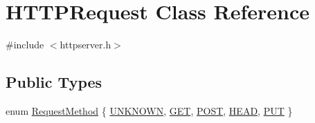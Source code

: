 \hypertarget{class_h_t_t_p_request}{}\section{H\+T\+T\+P\+Request Class Reference}
\label{class_h_t_t_p_request}


{\ttfamily \#include $<$httpserver.\+h$>$}

\subsection*{Public Types}
\begin{DoxyCompactItemize}
\item 
enum \mbox{\hyperlink{class_h_t_t_p_request_a1afe92e9caad997b8f88f0cb07dcc5aa}{Request\+Method}} \{ \newline
\mbox{\hyperlink{class_h_t_t_p_request_a1afe92e9caad997b8f88f0cb07dcc5aaae2331c29519b3237f4926d5be5f7c7a4}{U\+N\+K\+N\+O\+WN}}, 
\mbox{\hyperlink{class_h_t_t_p_request_a1afe92e9caad997b8f88f0cb07dcc5aaa066288ebc3abf9337c20f7d69a7cb77f}{G\+ET}}, 
\mbox{\hyperlink{class_h_t_t_p_request_a1afe92e9caad997b8f88f0cb07dcc5aaac8de8b5303c92a9f833e9e68c18d02d9}{P\+O\+ST}}, 
\mbox{\hyperlink{class_h_t_t_p_request_a1afe92e9caad997b8f88f0cb07dcc5aaaed9ed095188e3bc8f7235e41972afbe9}{H\+E\+AD}}, 
\newline
\mbox{\hyperlink{class_h_t_t_p_request_a1afe92e9caad997b8f88f0cb07dcc5aaa86909f8f99c1272199518e4eb860e175}{P\+UT}}
 \}
\end{DoxyCompactItemize}
